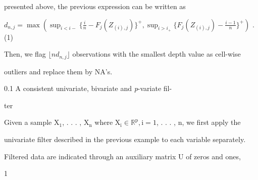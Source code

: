 \documentclass[a4paper,12pt]{article}
\begin{document}
presented above, the previous expression can be written as
\begin{center}
$d_{n,j}=\displaystyle \max(\sup_{i<i-}\{\frac{i}{n}-F_{j}(Z_{(i),j})\}^{+},\sup_{i>i_{+}}\{F_{j}(Z_{(i),j})-\frac{i-1}{n}\}^{+})$ .   (1)
\end{center}
Then, we flag $\lfloor nd_{n,j}\rfloor$ observations with the smallest depth value as cell-wise

outliers and replace them by NA’s.

0.1 A consistent univariate, bivariate and {\it p}-variate fil-

ter

Given a sample $\mathrm{X}_{1}$, . . . , $\mathrm{X}_{\mathrm{n}}$ where $\mathrm{X}_{\mathrm{i}} \in \mathbb{R}^{\mathrm{p}}, \mathrm{i}= 1$, . . . , $\mathrm{n}$, we first apply the

univariate filter described in the previous example to each variable separately.

Filtered data are indicated through an auxiliary matrix $\mathrm{U}$ of zeros and ones,

1
\end{document}

